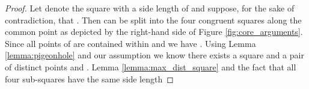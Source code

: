 \begin{isabellebody}
\begin{isamarkuptext}
\begin{lemma}
 \vskip 0pt
\isa{{\isasymLongrightarrow}} 
\end{lemma}
\begin{proof}
Let  denote the square with a side length of \isa{{\isasymdelta}} and suppose, for the sake of contradiction, that .
Then  can be split into the four congruent squares  along the common point
 as depicted by the right-hand side of Figure \ref{fig:core_arguments}.
Since all points of  are contained within  and  we have .
Using Lemma \ref{lemma:pigeonhole} and our assumption   we know there exists a square
\mbox{} and a pair of distinct points  and .
Lemma \ref{lemma:max_dist_square} and the fact that all four sub-squares have the same side length 

\end{proof}
\end{isamarkuptext}
\end{isabellebody}
